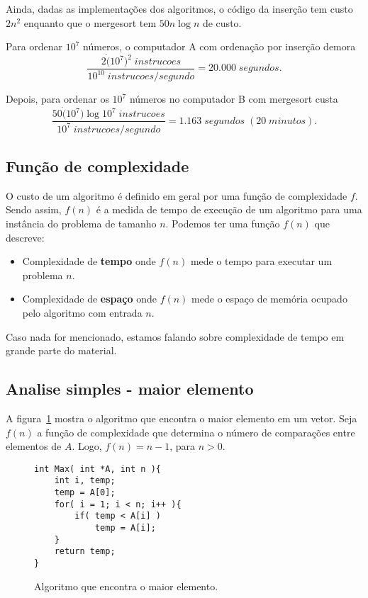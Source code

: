 Ainda, dadas as implementações dos algoritmos, o código da inserção tem custo
$2n^2$ enquanto que o mergesort tem $50n \log n$ de custo.

Para ordenar $10^7$ números, o computador A com ordenação por inserção demora
\begin{equation*}
\frac{2 \dot (10^7)^2\; instrucoes}{10^{10}\; instrucoes/segundo} = 20.000 \; segundos.
\end{equation*}

Depois, para ordenar os $10^7$ números no computador B com mergesort custa
\begin{equation*}
\frac{50 \dot (10^7) \log 10^7\; instrucoes}{10^{7}\; instrucoes/segundo} = 1.163 \; segundos \;(20\; minutos).
\end{equation*}

\subsection{Função de complexidade}

O custo de um algoritmo é definido em geral por uma função de complexidade $f$. Sendo assim,
$f(n)$ é a medida de tempo de execução de um algoritmo para uma instância do problema de tamanho $n$.
Podemos ter uma função $f(n)$ que descreve:
\begin{itemize}
\item Complexidade de {\bf tempo} onde $f(n)$ mede o tempo para executar um problema $n$.
\item Complexidade de {\bf espaço} onde $f(n)$ mede o espaço de memória ocupado pelo algoritmo
com entrada $n$.
\end{itemize}

Caso nada for mencionado, estamos falando sobre complexidade de tempo em grande parte do material.

\subsection{Analise simples - maior elemento}

A figura~\ref{aula02:algo:max} mostra o algoritmo que encontra o maior elemento em um vetor.
Seja $f(n)$ a função de complexidade que determina o número de comparações entre elementos de $A$.
Logo, $f(n) = n - 1$, para $n > 0$.
%
\begin{figure}[!htb]
\centering
\begin{framed}
\begin{lstlisting}
int Max( int *A, int n ){
	int i, temp;
	temp = A[0];
	for( i = 1; i < n; i++ ){
		if( temp < A[i] )
			temp = A[i];
	}
	return temp;
}
\end{lstlisting}
\end{framed}
\caption{Algoritmo que encontra o maior elemento.}
\label{aula02:algo:max}
\end{figure}

